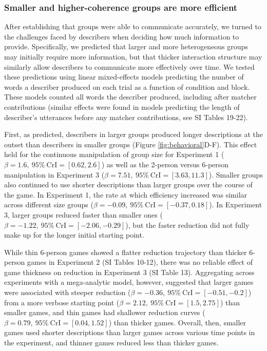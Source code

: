 \documentclass[
  english,
]{article}
\begin{document}
\hypertarget{smaller-and-higher-coherence-groups-are-more-efficient}{%
\subsubsection{Smaller and higher-coherence groups are more efficient}\label{smaller-and-higher-coherence-groups-are-more-efficient}}

After establishing that groups were able to communicate accurately, we turned to the challenges faced by describers when deciding how much information to provide.
Specifically, we predicted that larger and more heterogeneous groups may initially require more information, but that thicker interaction structure may similarly allow describers to communicate more effectively over time.
We tested these predictions using linear mixed-effects models predicting the number of words a describer produced on each trial as a function of condition and block.
These models counted all words the describer produced, including after matcher contributions (similar effects were found in models predicting the length of describer's utterances before any matcher contributions, see SI Tables 19-22).

First, as predicted, describers in larger groups produced longer descriptions at the outset than describers in smaller groups (Figure \ref{fig:behavioral}D-F).
This effect held for the continuous manipulation of group size for Experiment 1 (\(\beta=1.6,\:95\%\:\mathrm{CrI}=[0.62, 2.6]\)) as well as the 2-person versus 6-person manipulation in Experiment 3 (\(\beta=7.51,\:95\%\:\mathrm{CrI}=[3.63, 11.3]\)).
Smaller groups also continued to use shorter descriptions than larger groups over the course of the game.
In Experiment 1, the rate at which efficiency increased was similar across different size groups (\(\beta=-0.09,\:95\%\:\mathrm{CrI}=[-0.37, 0.18]\)).
In Experiment 3, larger groups reduced faster than smaller ones (\(\beta=-1.22,\:95\%\:\mathrm{CrI}=[-2.06, -0.29]\)), but the faster reduction did not fully make up for the longer initial starting point.

While thin 6-person games showed a flatter reduction trajectory than thicker 6-person games in Experiment 2 (SI Tables 10-12), there was no reliable effect of game thickness on reduction in Experiment 3 (SI Table 13).
Aggregating across experiments with a mega-analytic model, however, suggested that larger games were associated with steeper reduction (\(\beta=-0.36,\:95\%\:\mathrm{CrI}=[-0.51, -0.2]\)) from a more verbose starting point (\(\beta=2.12,\:95\%\:\mathrm{CrI}=[1.5, 2.75]\)) than smaller games, and thin games had shallower reduction curves (\(\beta=0.79,\:95\%\:\mathrm{CrI}=[0.04, 1.52]\)) than thicker games.
Overall, then, smaller games used shorter descriptions than larger games across various time points in the experiment, and thinner games reduced less than thicker games.
\end{document}
